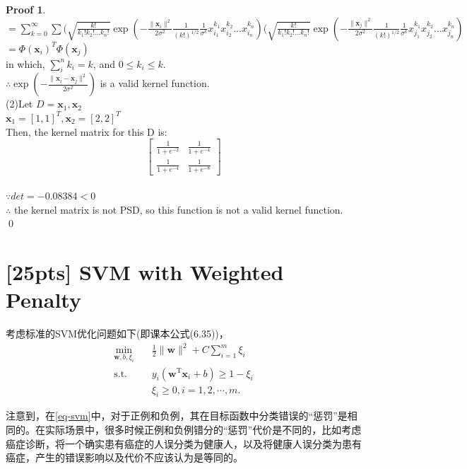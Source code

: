 \documentclass[a4paper,UTF8]{article}
\numberwithin{equation}{section}
\theoremstyle{definition}
\newtheorem*{prove}{Proof}
\begin{document}
\begin{prove}
$= \sum_{k=0}^{\infty}  \sum  (\sqrt{\frac{k!}{k_1!k_2!...k_n!}} \exp(-\frac{\lVert \mathbf{x}_i \rVert^2}{2\sigma^2} \frac{1}{(k!)^{1/2}} \frac{1}{\sigma^k} x_{i_1}^{k_1} x_{i_2}^{k_2} ... x_{i_n}^{k_n} ) ( \sqrt{\frac{k!}{k_1!k_2!...k_n!}} \exp(-\frac{\lVert \mathbf{x}_j \rVert^2}{2\sigma^2} \frac{1}{(k!)^{1/2}} \frac{1}{\sigma^k} x_{j_1}^{k_1} x_{j_2}^{k_2} ... x_{j_n}^{k_n})$\\
$= \Phi(\mathbf x_i)^T \Phi(\mathbf x_j)$\\
in which, $\sum_i^n k_i = k$, and $0 \leq k_i \leq k$.\\
$\therefore \exp(-\frac{\lVert \mathbf{x}_i - \mathbf{x}_j \rVert^2}{2\sigma^2})$   is a valid kernel function.\\
(2)Let $D={\mathbf{x}_1, \mathbf{x}_2}$\\
$\mathbf{x}_1=[1, 1]^T, \mathbf{x}_2=[2, 2]^T$\\
Then, the kernel matrix for this D is:\\
$$\left[
 \begin{matrix}
   \frac{1}{1+e^{-2}} & \frac{1}{1+e^{-4}}  \\
   \frac{1}{1+e^{-4}} & \frac{1}{1+e^{-8}}
  \end{matrix}
  \right]$$\\
$\because det= -0.08384 < 0$\\
$\therefore$ the kernel matrix is not PSD, so this function is not a valid kernel function.\\
\qed
\end{prove}

\section{[25pts] SVM with Weighted Penalty}
考虑标准的SVM优化问题如下(即课本公式(6.35))，
\begin{equation}
\label{eq-svm}
\begin{split}
\min_{\mathbf{w},b,\xi_i}& \quad \frac{1}{2} \lVert \mathbf{w} \rVert^2 + C\sum_{i=1}^m\xi_i\\
\text{s.t.}&  \quad y_i(\mathbf{w}^\mathrm{T}\mathbf{x}_i + b)\geq 1-\xi_i\\
& \quad \xi_i \geq 0, i = 1,2,\cdots,m.
\end{split}
\end{equation}

注意到，在\eqref{eq-svm}中，对于正例和负例，其在目标函数中分类错误的“惩罚”是相同的。在实际场景中，很多时候正例和负例错分的“惩罚”代价是不同的，比如考虑癌症诊断，将一个确实患有癌症的人误分类为健康人，以及将健康人误分类为患有癌症，产生的错误影响以及代价不应该认为是等同的。
\end{document}
